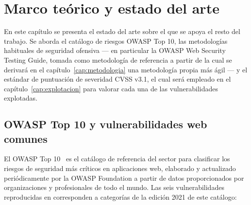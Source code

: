 \chapter{Marco teórico y estado del arte}
\label{cap:marco-teorico}

En este capítulo se presenta el estado del arte sobre el que se apoya el
resto del trabajo. Se aborda el catálogo de riesgos OWASP Top 10, las metodologías
habituales de seguridad ofensiva --- en particular la OWASP Web Security
Testing Guide, tomada como metodología de referencia a partir de la cual se
derivará en el capítulo~\ref{cap:metodologia} una metodología propia más
ágil --- y el estándar de puntuación de severidad
CVSS v3.1, el cual será empleado en el capítulo~\ref{cap:explotacion} para valorar cada
una de las vulnerabilidades explotadas.

\section{OWASP Top 10 y vulnerabilidades web comunes}

El OWASP Top 10~ es el catálogo de referencia del sector para
clasificar los riesgos de seguridad más críticos en aplicaciones web,
elaborado y actualizado periódicamente por la OWASP Foundation a partir de
datos proporcionados por organizaciones y profesionales de todo el mundo. Las seis
vulnerabilidades reproducidas en \breachlab corresponden a categorías de la
edición 2021 de este catálogo:

